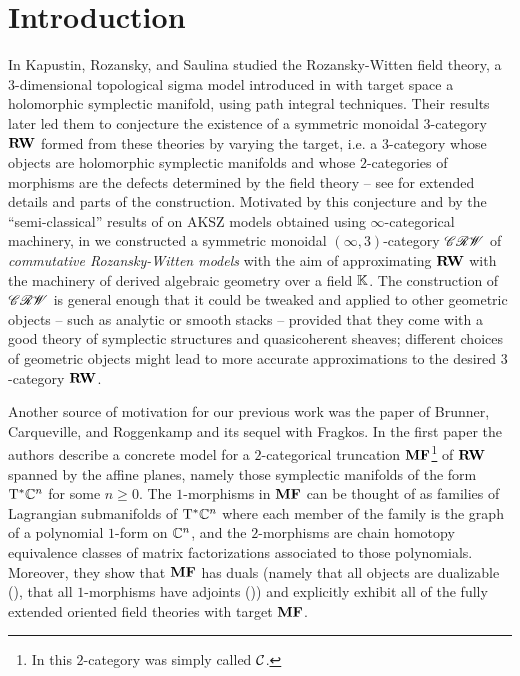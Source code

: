\section{Introduction} \label{sec:intro}

In \cite{KRS2009} Kapustin, Rozansky, and Saulina studied the Rozansky-Witten field theory, a $3$-dimensional topological sigma model introduced in \cite{RW1997} with target space a holomorphic symplectic manifold, using path integral techniques. Their results later led them to conjecture the existence of a symmetric monoidal $3$-category $\mathbf{RW}$ formed from these theories by varying the target, i.e. a $3$-category whose objects are holomorphic symplectic manifolds and whose $2$-categories of morphisms are the defects determined by the field theory -- see \cite{KR2010} for extended details and parts of the construction. Motivated by this conjecture and by the ``semi-classical'' results of \cite{CHS2022} on AKSZ models obtained using $\infty$-categorical machinery, in \cite{Riva2024} we constructed a symmetric monoidal $(\infty,3)$-category $\mathscr{CRW}$  of \emph{commutative Rozansky-Witten models} with the aim of approximating $\mathbf{RW}$ with the machinery of derived algebraic geometry over a field $\mathbb{K}$. The construction of $\mathscr{CRW}$ is general enough that it could be tweaked and applied to other geometric objects -- such as analytic or smooth stacks -- provided that they come with a good theory of symplectic structures and quasicoherent sheaves; different choices of geometric objects might lead to more accurate approximations to the desired $3$-category $\mathbf{RW}$.

Another source of motivation for our previous work was the paper \cite{BCR2023} of Brunner, Carqueville, and Roggenkamp and its sequel \cite{BCFR2023} with Fragkos. In the first paper the authors describe a concrete model for a $2$-categorical truncation $\mathbf{MF}$\footnote{In \cite{BCR2023} this $2$-category was simply called $\mathcal{C}$.} of $\mathbf{RW}$ spanned by the affine planes, namely those symplectic manifolds of the form $\mathrm{T}^\ast \mathbb{C}^n$ for some $n \geq 0$. The $1$-morphisms in $\mathbf{MF}$ can be thought of as families of Lagrangian submanifolds of $\mathrm{T}^\ast \mathbb{C}^n$ where each member of the family is the graph of a polynomial $1$-form on $\mathbb{C}^n$, and the $2$-morphisms are chain homotopy equivalence classes of matrix factorizations associated to those polynomials. Moreover, they show that $\mathbf{MF}$ has duals (namely that all objects are dualizable (\cite{BCR2023}), that all $1$-morphisms have adjoints (\cite{BCFR2023})) and explicitly exhibit all of the fully extended oriented field theories with target $\mathbf{MF}$. 

